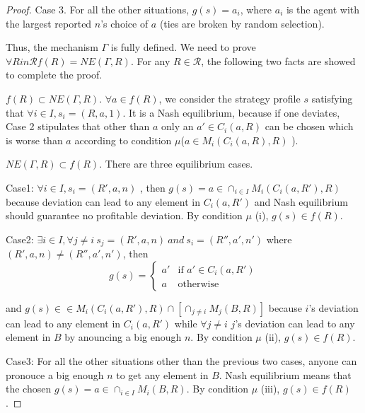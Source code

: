 \begin{proof}
Case 3. For all the other situations, $g(s) = a_i$, where $a_i$ is the agent with the largest
reported $n$'s choice of  $a$ (ties are broken by random selection).

Thus, the mechanism $\Gamma$ is fully defined.
We need to prove $\forall R in \mathscr{R} f(R) = NE(\Gamma, R)$. For
any $R \in \mathscr{R}$, the following two facts are showed to
complete the proof.

$f(R) \subset NE(\Gamma, R)$. $\forall a \in f(R)$, we consider the
strategy profile $s$ satisfying that $\forall i \in I, s_i = (R, a,
1)$. It is a Nash equilibrium, because  if one deviates, Case 2
stipulates that other than $a$ only an $a' \in C_i(a,R)$ can be chosen
which is worse than $a$ according to condition $\mu$($a \in
M_{i}(C_{i}(a,R),R)$ ).

$NE(\Gamma, R) \subset f(R)$.  There are three equilibrium
cases. 

Case1: $\forall i \in I, s_i =  (R', a, n)$ , then $g(s)= a \in
\cap_{i \in I}M_i(C_i(a,R'), R)$ because deviation can lead to any
element in $C_i(a,R')$ and Nash equilibrium should guarantee no
profitable deviation. By condition $\mu$ (i), $g(s) \in f(R)$.

Case2: $\exists i \in I, \forall j \not = i \ s_j=(R', a, n) \  and
\ s_i = (R'', a', n')$ where $ (R', a, n)  \not = (R'', a', n')$, then
$$g(s)= \begin{cases} 
 a'  & \text{if $a' \in C_i(a, R')$}\\ 
 a  & \text{otherwise} \end{cases} $$

and $g(s) \in  \in M_i(C_i(a, R'), R) \cap [ \cap_{j \not = i} M_j(B,
R)]$ because $i$'s deviation can lead to any element in $C_i(a, R')$
while $\forall j \not = i$  $j$'s deviation can lead to any element in $B$ by
anouncing a big enough $n$. By condition $\mu$ (ii), $g(s) \in f(R)$.


Case3: For all the other situations other than the previous two cases,
anyone can pronouce a big enough $n$ to get any  element in $B$. Nash
equilibrium means that the chosen $g(s)=a \in \cap_{i\in I} M_i(B,
R)$. By condition $\mu$ (iii), $g(s) \in f(R)$.








\end{proof}


